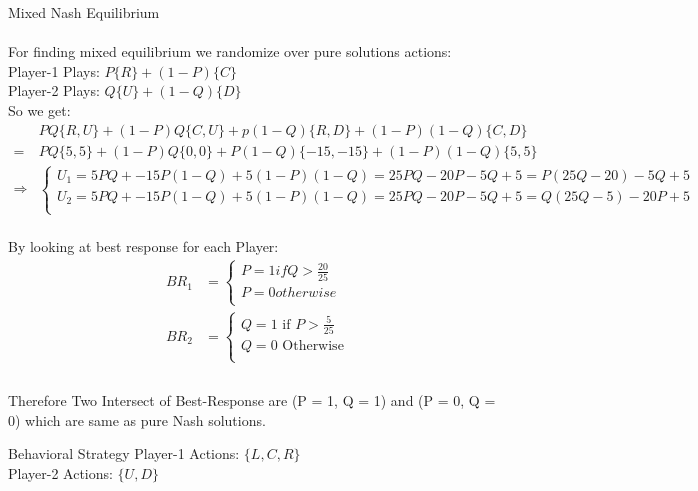 \documentclass[
  course = {{IE579 Game Theory and Multi-Agent Reinforcement Learning}},
  quartile = {{4}},
  assignment = 2,
  name = {{Mohammad Mahdi Rahimi}},
  studentnumber = {{20208244}},
  email = {{mahi@kaist.ac.kr}},
  firstexercise = 1
]{aga-homework}
\begin{document}
\subexercise Mixed Nash Equilibrium \\\\
For finding mixed equilibrium we randomize over pure solutions actions:\\
Player-1 Plays: $P\{R\} + (1 - P)\{C\}$\\
Player-2 Plays: $Q\{U\} + (1 - Q)\{D\}$\\
So we get:\\
\begin{equation} \label{eq1}
\begin{split}
& PQ\{R, U\} + (1 - P)Q\{C, U\} + p(1 - Q)\{R, D\} + (1 - P)(1 - Q)\{C, D\} \\
= & PQ\{5, 5\} + (1 - P)Q\{0, 0\} + P(1 - Q)\{-15, -15\} + (1 - P)(1 - Q)\{5, 5\}\\
\Rightarrow &   \begin{cases}
      U_1 = 5PQ + -15P(1 - Q) + 5(1 - P)(1 - Q) = 25PQ - 20P - 5Q + 5 = P(25Q - 20) - 5Q + 5 \\
      U_2 = 5PQ + -15P(1 - Q) + 5(1 - P)(1 - Q) = 25PQ - 20P - 5Q + 5 = Q(25Q - 5) - 20P + 5 \\
     \end{cases}
\end{split}
\end{equation}\\
By looking at best response for each Player:
\begin{equation} \label{eq1}
\begin{split}
BR_1 & = \begin{cases}
      P = 1 if  Q > \frac{20}{25} \\
      P = 0 otherwise\\
     \end{cases}\\
BR_2 & = \begin{cases}
      Q = 1\text{ if  }P > \frac{5}{25} \\
      Q = 0\text{ Otherwise }\\
     \end{cases}\\
\end{split}
\end{equation}\\
Therefore Two Intersect of Best-Response are (P = 1, Q = 1) and (P = 0, Q = 0) which are same as pure Nash solutions.

\subexercise Behavioral Strategy
Player-1 Actions: $\{L, C, R\}$\\
Player-2 Actions: $\{U, D\}$\\
\end{document}
